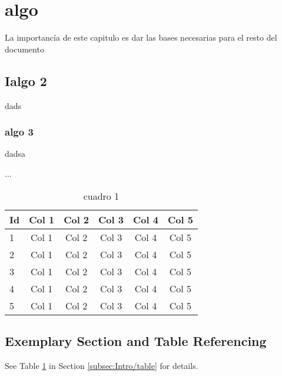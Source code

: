 
\clearpage

\section{algo}
\label{sec:Intro}
La importancía de este capitulo es dar las bases necesarias para el resto del documento

\subsection{Ialgo 2}
dads
\subsubsection{algo 3}
dadsa

\label{subsec:Intro/table}
...

\begin{longtable}{l|ccccc}
  \caption{cuadro 1}
  \label{table:table-1}
  \\
  \textbf{Id} & \textbf{Col 1} & \textbf{Col 2}& \textbf{Col 3} & \textbf{Col 4} & \textbf{Col 5}\\
  \hline
  1 & Col 1 & Col 2 & Col 3 & Col 4 & Col 5\\
  2 & Col 1 & Col 2 & Col 3 & Col 4 & Col 5\\
  3 & Col 1 & Col 2 & Col 3 & Col 4 & Col 5\\
  4 & Col 1 & Col 2 & Col 3 & Col 4 & Col 5\\
  5 & Col 1 & Col 2 & Col 3 & Col 4 & Col 5\\
\end{longtable}

\subsection{Exemplary Section and Table Referencing}
\label{subsec:Intro/rfs}

See Table \ref{table:table-1} in Section \ref{subsec:Intro/table}  for details.